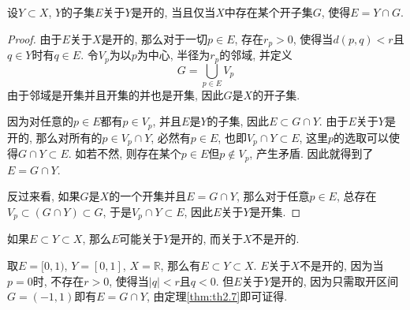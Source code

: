 \documentclass[cn,12pt,math=mtpro2,citestyle=gb7714-2015,bibstyle=gb7714-2015,twocol]{elegantbook}
\newcommand{\R}{\mathbb{R}}
\begin{document}
\begin{theorem}\label{thm:th2.7}
  设$Y\subset X$, $Y$的子集$E$关于$Y$是开的, 当且仅当$X$中存在某个开子集$G$, 使得$E=Y\cap G$.
\end{theorem}
\begin{proof}
  由于$E$关于$X$是开的, 那么对于一切$ p\in E$, 存在$r_p>0$, 使得当$d(p,q)<r$且$q\in Y$时有$q\in E$. 令$V_p$为以$p$为中心, 半径为$r_p$的邻域, 并定义
  $$G=\bigcup_{p\in E}V_p$$
  由于邻域是开集并且开集的并也是开集, 因此$G$是$X$的开子集.

  因为对任意的$p\in E$都有$p \in V_p$, 并且$E$是$Y$的子集, 因此$E\subset G\cap Y$. 由于$E$关于$Y$是开的, 那么对所有的$ p\in V_p\cap Y$, 必然有$p\in E$, 也即$V_p\cap Y\subset E$, 这里$p$的选取可以使得$G\cap Y\subset E$. 如若不然, 则存在某个$p \in E$但$p\notin V_p$, 产生矛盾. 因此就得到了$E=G\cap Y$.

  反过来看, 如果$G$是$X$的一个开集并且$E=G\cap Y$, 那么对于任意$p \in E$, 总存在$ V_p\subset (G\cap Y)\subset G$, 于是$V_p\cap Y\subset E$, 因此$E$关于$Y$是开集.


\end{proof}
\begin{example}\label{ex222}
如果$E\subset Y\subset X$, 那么$E$可能关于$Y$是开的, 而关于$X$不是开的.

取$E=[0,1)$, $Y=[0,1]$, $X=\R$, 那么有$E\subset Y\subset X$. $E$关于$X$不是开的, 因为当$p=0$时, 不存在$r>0$, 使得当$|q|<r$且$q<0$. 但$E$关于$Y$是开的, 因为只需取开区间$G=(-1,1)$即有$E=G\cap Y$, 由定理\ref{thm:th2.7}即可证得.
\end{example}
\end{document}
